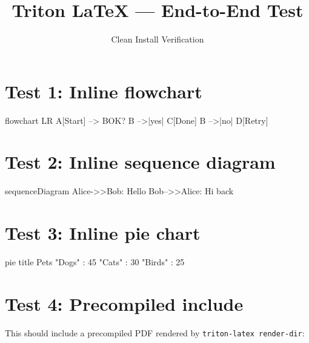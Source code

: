 \documentclass{article}
\title{Triton LaTeX --- End-to-End Test}
\author{Clean Install Verification}
\date{}
\begin{document}
\maketitle

\section{Test 1: Inline flowchart}

\begin{center}
\begin{triton}
flowchart LR
  A[Start] --> B{OK?}
  B -->|yes| C[Done]
  B -->|no| D[Retry]
\end{triton}
\end{center}

\section{Test 2: Inline sequence diagram}

\begin{center}
\begin{triton}
sequenceDiagram
  Alice->>Bob: Hello
  Bob-->>Alice: Hi back
\end{triton}
\end{center}

\section{Test 3: Inline pie chart}

\begin{center}
\begin{triton}
pie title Pets
  "Dogs" : 45
  "Cats" : 30
  "Birds" : 25
\end{triton}
\end{center}

\section{Test 4: Precompiled include}

This should include a precompiled PDF rendered by \texttt{triton-latex render-dir}:

\begin{center}
\end{center}
\end{document}

